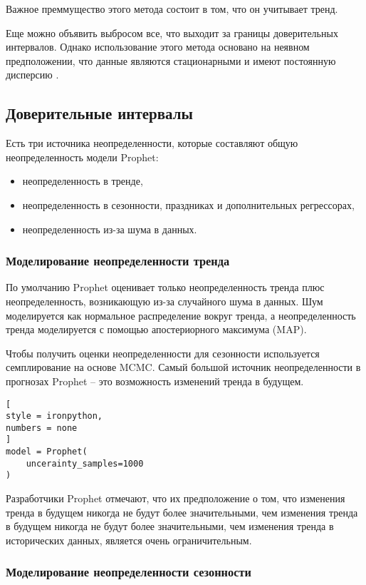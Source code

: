 \documentclass[%
	11pt,
	a4paper,
	utf8,
		]{article}
\begin{document}
Важное преммущество этого метода состоит в том, что он учитывает тренд.

Еще можно объявить выбросом все, что выходит за границы доверительных интервалов. Однако использование этого метода основано на неявном предположении, что данные являются стационарными и имеют постоянную дисперсию \cite[]{gruzdev:time-series-2022}. 

\subsection{Доверительные интервалы}

Есть три источника неопределенности, которые составляют общую неопределенность модели Prophet:
\begin{itemize}
	\item неопределенность в тренде,
	
	\item неопределенность в сезонности, праздниках и дополнительных регрессорах,
	
	\item неопределенность из-за шума в данных.
\end{itemize}

\subsubsection{Моделирование неопределенности тренда}

По умолчанию Prophet оценивает только неопределенность тренда плюс неопределенность, возникающую из-за случайного шума в данных. Шум моделируется как нормальное распределение вокруг тренда, а неопределенность тренда моделируется с помощью апостериорного максимума (MAP).

Чтобы получить оценки неопределенности для сезонности используется семплирование на основе MCMC. Самый большой источник неопределенности в прогнозах Prophet -- это возможность изменений тренда в будущем.
\begin{lstlisting}[
style = ironpython,
numbers = none
]
model = Prophet(
    uncerainty_samples=1000
)
\end{lstlisting}

Разработчики Prophet отмечают, что их предположение о том, что изменения тренда в будущем никогда не будут более значительными, чем изменения тренда в будущем никогда не будут более значительными, чем изменения тренда в исторических данных, является очень ограничительным.

\subsubsection{Моделирование неопределенности сезонности}
\end{document}
